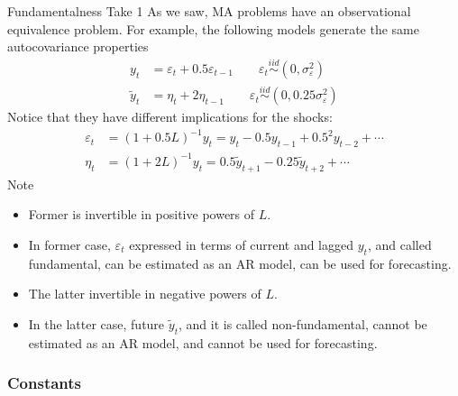 \documentclass[aspectratio=169, handout]{beamer}
\newcommand{\iid}{\overset{iid}{\sim}}
\begin{document}
{\footnotesize
\begin{frame}{Fundamentalness Take 1}
As we saw, MA problems have an observational equivalence problem.
For example, the following models generate the same autocovariance
properties
\begin{align*}
  y_t &= \varepsilon_t + 0.5 \varepsilon_{t-1}
  \qquad
  \varepsilon_t\iid(0,\sigma^2_\varepsilon)
  \\
  \tilde{y}_t &= \eta_t + 2\eta_{t-1}
  \qquad
  \varepsilon_t\iid(0,0.25\sigma^2_\varepsilon)
\end{align*}
Notice that they have different implications for the shocks:
\begin{align*}
  \varepsilon_t
  &=
  (1+0.5L)^{-1}y_t
  =
  y_t-0.5 y_{t-1} + 0.5^2 y_{t-2} + \cdots
  \\
  \eta_t
  &=
  (1+2L)^{-1}y_t
  =
  0.5 \tilde{y}_{t+1} - 0.25 \tilde{y}_{t+2} + \cdots
\end{align*}
Note
\begin{itemize}
  \item Former is invertible in \alert{positive} powers of $L$.
  \item In former case, $\varepsilon_t$ expressed in terms of
    \alert{current and lagged} $y_t$, and called
    \alert{fundamental}, can be estimated as an AR model, can be
    used for forecasting.

  \item The latter invertible in \alert{negative} powers of $L$.

  \item In the latter case, \alert{future} $\tilde{y}_t$, and it is
    called non-fundamental, cannot be estimated as an AR model, and
    cannot be used for forecasting.
\end{itemize}
\end{frame}
}



\subsubsection{Constants}
\end{document}
